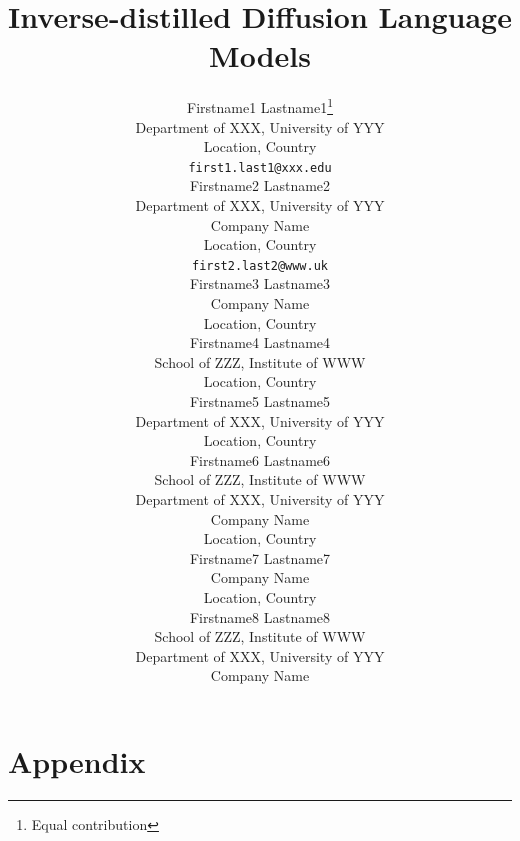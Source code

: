 \documentclass{article} %
\title{Inverse-distilled Diffusion Language Models}
\author{Firstname1 Lastname1\thanks{Equal contribution} \\
Department of XXX, University of YYY\\
Location, Country\\
\texttt{first1.last1@xxx.edu} \\
\And
Firstname2 Lastname2\footnotemark[1] \\
Department of XXX, University of YYY\\
Company Name\\
Location, Country\\
\texttt{first2.last2@www.uk} \\
\And
Firstname3 Lastname3 \\
Company Name\\
Location, Country\\
\And
Firstname4 Lastname4 \\
School of ZZZ, Institute of WWW\\
Location, Country\\
\And
Firstname5 Lastname5 \\
Department of XXX, University of YYY\\
Location, Country\\
\And
Firstname6 Lastname6 \\
School of ZZZ, Institute of WWW\\
Department of XXX, University of YYY\\
Company Name\\
Location, Country\\
\And
Firstname7 Lastname7 \\
Company Name\\
Location, Country\\
\And
Firstname8 Lastname8 \\
School of ZZZ, Institute of WWW\\
Department of XXX, University of YYY\\
Company Name
}
\theoremstyle{plain}
\theoremstyle{definition}
\theoremstyle{remark}
\begin{document}
\maketitle



% 



% 

\clearpage

\nocite{langley00}




\newpage
\appendix
\section*{Appendix}








% 
\end{document}

